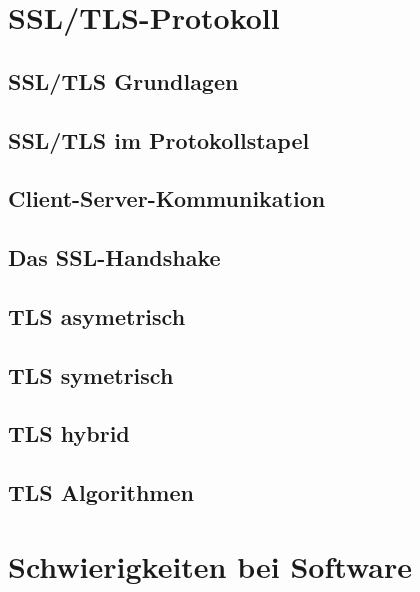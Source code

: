 \documentclass[11pt]{scrartcl}
\begin{document}
\section{SSL/TLS-Protokoll}
\label{sec:ssl/tls-protocol}

\subsection{SSL/TLS Grundlagen}
\label{sec:ssl-tls-basics}

\subsection{SSL/TLS im Protokollstapel}
\label{sec:ssl-tls-protocolstack}

\subsection{Client-Server-Kommunikation}
\label{sec:client-server-communication}



\subsection{Das SSL-Handshake}
\label{sec:ssl-handshake}

\subsection{TLS asymetrisch}
\label{sec:tls-asymetric}

\subsection{TLS symetrisch}
\label{sec:tls-symetric}

\subsection{TLS hybrid}
\label{sec:tls-hybrid}

\subsection{TLS Algorithmen}
\label{sec:tls-algorithmen}


\section{Schwierigkeiten bei Software}
\label{sec:sw-trouble}
\end{document}
